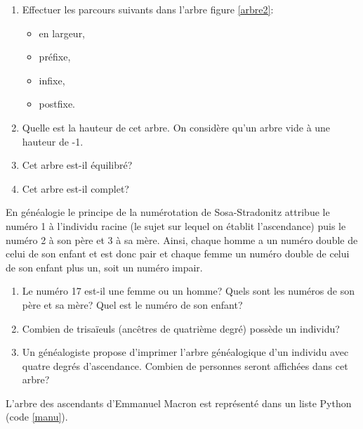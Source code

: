 \documentclass[a4paper,11pt]{article}
\begin{document}
\begin{Form}
\begin{exo}
\begin{center}
\label{arbre2}
\end{center}
\begin{enumerate}
\item Effectuer les parcours suivants dans l'arbre figure \ref{arbre2}:
\begin{itemize}
\item en largeur,
\item préfixe,
\item infixe,
\item postfixe.
\end{itemize}
\item Quelle est la hauteur de cet arbre. On considère qu'un arbre vide à une hauteur de -1.
\item Cet arbre est-il équilibré?
\item Cet arbre est-il complet?
\end{enumerate}
\end{exo}
\begin{exo}
En généalogie le principe de la numérotation de Sosa-Stradonitz attribue le numéro 1 à l’individu racine (le sujet sur lequel on établit l’ascendance) puis le numéro 2 à son père et 3 à sa mère. Ainsi, chaque homme a un numéro double de celui de son enfant et est donc pair et chaque femme un numéro double de celui de son enfant plus un, soit un numéro impair.
\begin{enumerate}
\item Le numéro 17 est-il une femme ou un homme? Quels sont les numéros de son père et sa mère? Quel est le numéro de son enfant?
\item Combien de trisaïeuls (ancêtres de quatrième degré) possède un individu?
\item Un généalogiste propose d'imprimer l'arbre généalogique d'un individu avec quatre degrés d'ascendance. Combien de personnes seront affichées dans cet arbre?
\end{enumerate}
L'arbre des ascendants d'Emmanuel Macron est représenté dans un liste Python (code \ref{manu}).
\begin{center}


\end{center}
\end{exo}
\end{Form}
\end{document}
